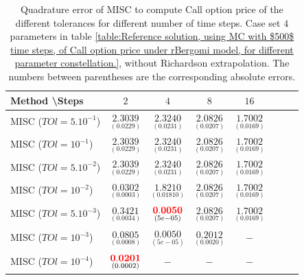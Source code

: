 \documentclass[11pt]{article}
\begin{document}
\begin{table}[h!]
\centering
\begin{tabular}{l*{6}{c}r}
Method \textbackslash  Steps            & $2$ & $4$ & $8$ & $16$  \\
\hline
MISC ($TOl=5.10^{-1}$)  & $\underset{ (0.0229) }{\mathbf{  2.3039}}$ & $\underset{(0.0231)}{\mathbf{  2.3240}}$ & $\underset{(  0.0207)}{\mathbf{ 2.0826}}$ & $\underset{(   0.0169)}{\mathbf{ 1.7002}}$   \\
MISC ($TOl=10^{-1}$)  & $\underset{ (0.0229) }{\mathbf{  2.3039}}$ &  $\underset{(0.0231)}{\mathbf{  2.3240}}$ & $\underset{(  0.0207)}{\mathbf{ 2.0826}}$ & $\underset{(   0.0169)}{\mathbf{ 1.7002}}$  \\
MISC ($TOl=5.10^{-2}$)  &$\underset{ (0.0229) }{\mathbf{  2.3039}}$ &  $\underset{(0.0231)}{\mathbf{  2.3240}}$ & $\underset{(  0.0207)}{\mathbf{ 2.0826}}$ & $\underset{(   0.0169)}{\mathbf{ 1.7002}}$   \\
MISC ($TOl=10^{-2}$)  & $\underset{(0.0003)}{\mathbf{
		0.0302}}$ & $\underset{( 0.01810)}{\mathbf{1.8210
}}$ & $\underset{(  0.0207)}{\mathbf{ 2.0826}}$ & $\underset{(   0.0169)}{\mathbf{ 1.7002}}$  \\
MISC ($TOl=5.10^{-3}$)  & $\underset{(0.0034)}{\mathbf{
		0.3421}}$ & $\underset{(5e-05)}{\mathbf{{\color{red}0.0050}
}}$ & $\underset{(  0.0207)}{\mathbf{ 2.0826}}$ & $\underset{(   0.0169)}{\mathbf{ 1.7002}}$  \\
MISC ($TOl=10^{-3}$)  & $\underset{(0.0008)}{\mathbf{    0.0805}}$ & $\underset{(5e-05)}{\mathbf{0.0050
}}$ & $\underset{( 0.0020)}{\mathbf{ 0.2012		}}$ & $-$  \\
MISC ($TOl=10^{-4}$)  & $\underset{(0.0002)}{\mathbf{   {\color{red}0.0201}}}$ & $-$ & $-$ & $-$  \\
\hline
\end{tabular}
\caption{Quadrature error of MISC to compute Call option price of the different tolerances for different number of time steps. Case  set $4$ parameters in table \ref{table:Reference solution, using MC with $500$ time steps, of Call option price under rBergomi model, for different parameter constellation.}, without Richardson extrapolation. The numbers between parentheses are the corresponding absolute errors.}
\label{Quadrature error of MISC to compute Call option price of the different tolerances for different number of time steps. Case  set $4$ parameters, without Richardson extrapolation. The numbers between parentheses are the corresponding absolute errors.}
\end{table}
\end{document}
